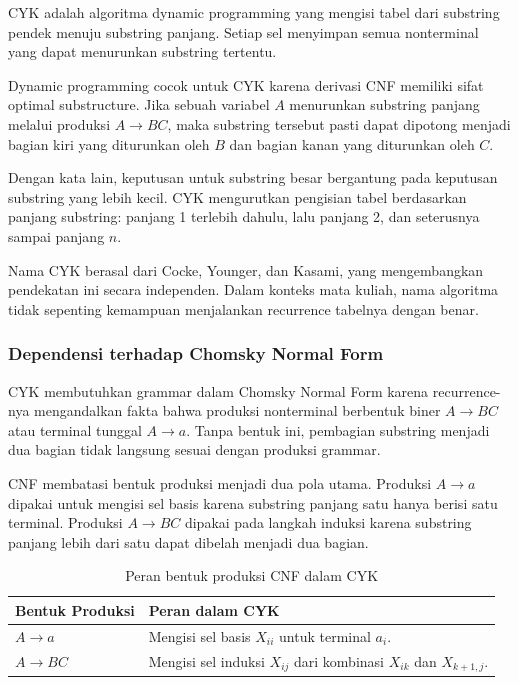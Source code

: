 \begin{jawab}
CYK adalah algoritma dynamic programming yang mengisi tabel dari substring pendek menuju substring panjang. Setiap sel menyimpan semua nonterminal yang dapat menurunkan substring tertentu.
\end{jawab}

Dynamic programming cocok untuk CYK karena derivasi CNF memiliki sifat optimal substructure. Jika sebuah variabel $A$ menurunkan substring panjang melalui produksi $A\rightarrow BC$, maka substring tersebut pasti dapat dipotong menjadi bagian kiri yang diturunkan oleh $B$ dan bagian kanan yang diturunkan oleh $C$.

Dengan kata lain, keputusan untuk substring besar bergantung pada keputusan substring yang lebih kecil. CYK mengurutkan pengisian tabel berdasarkan panjang substring: panjang 1 terlebih dahulu, lalu panjang 2, dan seterusnya sampai panjang $n$.

Nama CYK berasal dari Cocke, Younger, dan Kasami, yang mengembangkan pendekatan ini secara independen. Dalam konteks mata kuliah, nama algoritma tidak sepenting kemampuan menjalankan recurrence tabelnya dengan benar.

\subsubsection{Dependensi terhadap Chomsky Normal Form}

\begin{jawab}
CYK membutuhkan grammar dalam Chomsky Normal Form karena recurrence-nya mengandalkan fakta bahwa produksi nonterminal berbentuk biner $A\rightarrow BC$ atau terminal tunggal $A\rightarrow a$. Tanpa bentuk ini, pembagian substring menjadi dua bagian tidak langsung sesuai dengan produksi grammar.
\end{jawab}

CNF membatasi bentuk produksi menjadi dua pola utama. Produksi $A\rightarrow a$ dipakai untuk mengisi sel basis karena substring panjang satu hanya berisi satu terminal. Produksi $A\rightarrow BC$ dipakai pada langkah induksi karena substring panjang lebih dari satu dapat dibelah menjadi dua bagian.

\begin{table}[H]
\centering
\begin{tabularx}{\textwidth}{|L{0.24\textwidth}|X|}
\hline
\textbf{Bentuk Produksi} & \textbf{Peran dalam CYK} \\
\hline
$A\rightarrow a$ & Mengisi sel basis $X_{ii}$ untuk terminal $a_i$. \\
\hline
$A\rightarrow BC$ & Mengisi sel induksi $X_{ij}$ dari kombinasi $X_{ik}$ dan $X_{k+1,j}$. \\
\hline
\end{tabularx}
\caption{Peran bentuk produksi CNF dalam CYK}
\label{tab:cnf-cyk}
\end{table}

